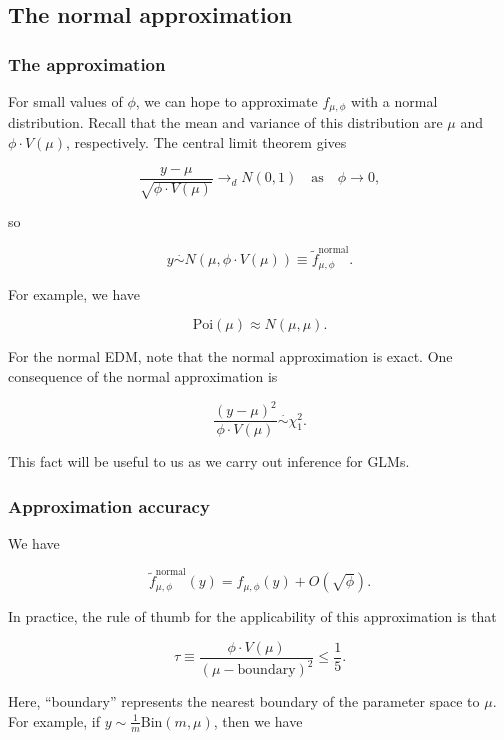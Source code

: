 \documentclass[
  11pt,
  letterpaper,
  oneside]{book}
\theoremstyle{definition}
\theoremstyle{plain}
\theoremstyle{plain}
\theoremstyle{plain}
\theoremstyle{remark}
\begin{document}
\hypertarget{the-normal-approximation}{%
\subsection{The normal approximation}\label{the-normal-approximation}}

\hypertarget{the-approximation}{%
\subsubsection{The approximation}\label{the-approximation}}

For small values of \(\phi\), we can hope to approximate
\(f_{\mu, \phi}\) with a normal distribution. Recall that the mean and
variance of this distribution are \(\mu\) and \(\phi \cdot V(\mu)\),
respectively. The central limit theorem gives

\[
\frac{y - \mu}{\sqrt{\phi \cdot V(\mu)}} \rightarrow_d N(0,1) \quad \text{as} \quad \phi \rightarrow 0,
\]

so

\[
y \overset \cdot \sim N(\mu, \phi \cdot V(\mu)) \equiv \tilde f^{\text{normal}}_{\mu, \phi}.
\]

For example, we have

\[
\text{Poi}(\mu) \approx N(\mu, \mu).
\]

For the normal EDM, note that the normal approximation is exact. One
consequence of the normal approximation is

\[
\frac{(y - \mu)^2}{\phi \cdot V(\mu)} \overset \cdot \sim \chi^2_1.
\]

This fact will be useful to us as we carry out inference for GLMs.

\hypertarget{approximation-accuracy}{%
\subsubsection{Approximation accuracy}\label{approximation-accuracy}}

We have

\[
\tilde f^{\text{normal}}_{\mu, \phi}(y) = f_{\mu, \phi}(y) + O(\sqrt{\phi}).
\]

In practice, the rule of thumb for the applicability of this
approximation is that

\[
\tau \equiv \frac{\phi \cdot V(\mu)}{(\mu - \text{boundary})^2} \leq \frac{1}{5}.
\]

Here, ``boundary'' represents the nearest boundary of the parameter
space to \(\mu\). For example, if
\(y \sim \frac{1}{m}\text{Bin}(m, \mu)\), then we have
\end{document}
